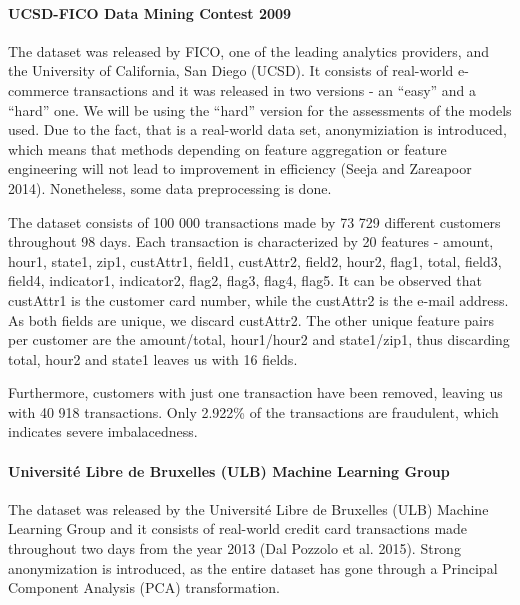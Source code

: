 \documentclass[12pt,]{article}
\let\oldparagraph\paragraph
\renewcommand{\paragraph}[1]{\oldparagraph{#1}\mbox{}}
\begin{document}
\hypertarget{ucsd-fico-data-mining-contest-2009}{%
\paragraph{UCSD-FICO Data Mining Contest
2009}\label{ucsd-fico-data-mining-contest-2009}}

The dataset was released by FICO, one of the leading analytics
providers, and the University of California, San Diego (UCSD). It
consists of real-world e-commerce transactions and it was released in
two versions - an ``easy'' and a ``hard'' one. We will be using the
``hard'' version for the assessments of the models used. Due to the
fact, that is a real-world data set, anonymiziation is introduced, which
means that methods depending on feature aggregation or feature
engineering will not lead to improvement in efficiency (Seeja and
Zareapoor 2014). Nonetheless, some data preprocessing is done.

The dataset consists of 100 000 transactions made by 73 729 different
customers throughout 98 days. Each transaction is characterized by 20
features - amount, hour1, state1, zip1, custAttr1, field1, custAttr2,
field2, hour2, flag1, total, field3, field4, indicator1, indicator2,
flag2, flag3, flag4, flag5. It can be observed that custAttr1 is the
customer card number, while the custAttr2 is the e-mail address. As both
fields are unique, we discard custAttr2. The other unique feature pairs
per customer are the amount/total, hour1/hour2 and state1/zip1, thus
discarding total, hour2 and state1 leaves us with 16 fields.

Furthermore, customers with just one transaction have been removed,
leaving us with 40 918 transactions. Only 2.922\% of the transactions
are fraudulent, which indicates severe imbalacedness.

\hypertarget{universite-libre-de-bruxelles-ulb-machine-learning-group}{%
\paragraph{Université Libre de Bruxelles (ULB) Machine Learning
Group}\label{universite-libre-de-bruxelles-ulb-machine-learning-group}}

The dataset was released by the Université Libre de Bruxelles (ULB)
Machine Learning Group and it consists of real-world credit card
transactions made throughout two days from the year 2013 (Dal Pozzolo et
al. 2015). Strong anonymization is introduced, as the entire dataset has
gone through a Principal Component Analysis (PCA) transformation.
\end{document}
